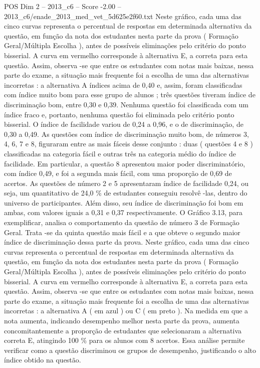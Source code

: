 \begin{textsample}{POS Dim 2 – 2013\_c6 – Score -2.00 – 2013\_c6/enade\_2013\_med\_vet\_5d625e2f60.txt}
Neste gráfico, cada uma das cinco curvas representa o percentual de respostas em determinada alternativa da questão, em função da nota dos estudantes nesta parte da prova ( Formação Geral/Múltipla Escolha ), antes de possíveis eliminações pelo critério do ponto bisserial.
A curva em vermelho corresponde à alternativa E, a correta para esta questão.
Assim, observa -se que entre os estudantes com notas mais baixas, nessa parte do exame, a situação mais frequente foi a escolha de uma das alternativas incorretas : a alternativa A índices acima de 0,40 e, assim, foram classificadas com índice muito bom para esse grupo de alunos ; três questões tiveram índice de discriminação bom, entre 0,30 e 0,39.
Nenhuma questão foi classificada com um índice fraco e, portanto, nenhuma questão foi eliminada pelo critério ponto bisserial.
O índice de facilidade variou de 0,24 a 0,96, e o de discriminação, de 0,30 a 0,49.
As questões com índice de discriminação muito bom, de números 3, 4, 6, 7 e 8, figuraram entre as mais fáceis desse conjunto : duas ( questões 4 e 8 ) classificadas na categoria fácil e outras três na categoria médio do índice de facilidade.
Em particular, a questão 8 apresentou maior poder discriminatório, com índice 0,49, e foi a segunda mais fácil, com uma proporção de 0,69 de acertos.
As questões de número 2 e 5 apresentaram índice de facilidade 0,24, ou seja, um quantitativo de 24,0 \% de estudantes conseguiu resolvê -las, dentro do universo de participantes.
Além disso, seu índice de discriminação foi bom em ambas, com valores iguais a 0,31 e 0,37 respectivamente.
O Gráfico 3.13, para exemplificar, analisa o comportamento da questão de número 3 de Formação Geral.
Trata -se da quinta questão mais fácil e a que obteve o segundo maior índice de discriminação dessa parte da prova.
Neste gráfico, cada uma das cinco curvas representa o percentual de respostas em determinada alternativa da questão, em função da nota dos estudantes nesta parte da prova ( Formação Geral/Múltipla Escolha ), antes de possíveis eliminações pelo critério do ponto bisserial.
A curva em vermelho corresponde à alternativa E, a correta para esta questão.
Assim, observa -se que entre os estudantes com notas mais baixas, nessa parte do exame, a situação mais frequente foi a escolha de uma das alternativas incorretas : a alternativa A ( em azul ) ou C ( em preto ).
Na medida em que a nota aumenta, indicando desempenho melhor nesta parte da prova, aumenta concomitantemente a proporção de estudantes que selecionaram a alternativa correta E, atingindo 100 \% para os alunos com 8 acertos.
Essa análise permite verificar como a questão discriminou os grupos de desempenho, justificando o alto índice obtido na questão.

\end{textsample}

